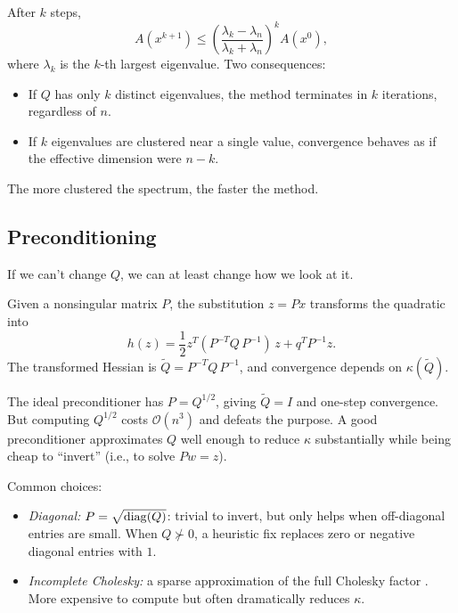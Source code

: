\begin{theorem}\label{thm:cg-eigen-conv}
	After $k$ steps,
	\begin{equation}\label{eq:cg-eigenvalue-bound}
		A(x^{k+1}) \leq \left(\frac{\lambda_k - \lambda_n}{\lambda_k + \lambda_n}\right)^{\!k} A(x^0),
	\end{equation}
	where $\lambda_k$ is the $k$-th largest eigenvalue.
	Two consequences:
	\begin{itemize}
		\item If $Q$ has only $k$ distinct eigenvalues, the method terminates in $k$ iterations, regardless of $n$.
		\item If $k$ eigenvalues are clustered near a single value, convergence behaves as if the effective dimension were $n - k$.
	\end{itemize}
	The more clustered the spectrum, the faster the method.
\end{theorem}


\subsection{Preconditioning}\label{sec:preconditioning}

If we can't change $Q$, we can at least change how we look at it.

\begin{definition}\label{def:preconditioner}
	Given a nonsingular matrix $P$, the substitution $z = Px$ transforms the quadratic into
	\begin{equation}\label{eq:preconditioned-system}
		h(z) = \frac{1}{2} z^T (P^{-T} Q\, P^{-1})\, z + q^T P^{-1} z.
	\end{equation}
	The transformed Hessian is $\tilde{Q} = P^{-T} Q\, P^{-1}$, and convergence depends on $\kappa(\tilde{Q})$.
\end{definition}

The ideal preconditioner has $P = Q^{1/2}$, giving $\tilde{Q} = I$ and one-step convergence.
But computing $Q^{1/2}$ costs $\mathcal{O}(n^3)$ and defeats the purpose.
A good preconditioner approximates $Q$ well enough to reduce $\kappa$ substantially while being cheap to ``invert'' (i.e., to solve $Pw = z$).

Common choices:
\begin{itemize}
	\item \textit{Diagonal:} $P = \sqrt{\operatorname{diag}(Q)}$: trivial to invert, but only helps when off-diagonal entries are small.
		When $Q \not\succ 0$, a heuristic fix replaces zero or negative diagonal entries with $1$.
	\item \textit{Incomplete Cholesky:} a sparse approximation of the full Cholesky factor \cite{nocedal2006}.
		More expensive to compute but often dramatically reduces $\kappa$.
\end{itemize}

